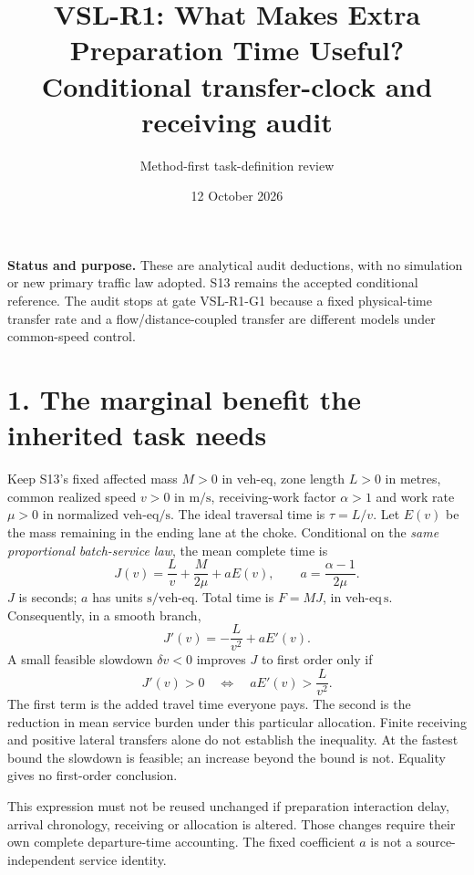 \documentclass[11pt]{article}
\title{VSL-R1: What Makes Extra Preparation Time Useful?\\[0.25em]
\large Conditional transfer-clock and receiving audit}
\author{Method-first task-definition review}
\date{12 October 2026}
\newcommand{\ve}{\mathrm{veh\mbox{-}eq}}
\begin{document}
\maketitle
\vspace{-1em}

\textbf{Status and purpose.} These are analytical audit deductions, with no
simulation or new primary traffic law adopted. S13 remains the accepted
conditional reference. The audit stops at gate VSL-R1-G1 because a fixed
physical-time transfer rate and a flow/distance-coupled transfer are different
models under common-speed control.

\section*{1. The marginal benefit the inherited task needs}
Keep S13's fixed affected mass $M>0$ in $\ve$, zone length $L>0$ in metres,
common realized speed $v>0$ in $\mathrm{m/s}$, receiving-work factor
$\alpha>1$ and work rate $\mu>0$ in normalized $\ve/\mathrm{s}$.
The ideal traversal time is $\tau=L/v$. Let $E(v)$ be the mass remaining in
the ending lane at the choke. Conditional on the \emph{same proportional
batch-service law}, the mean complete time is
\begin{equation}
 J(v)=\frac{L}{v}+\frac{M}{2\mu}+aE(v),
 \qquad a=\frac{\alpha-1}{2\mu}.
 \label{eq:objective}
\end{equation}
$J$ is seconds; $a$ has units $\mathrm{s}/\ve$. Total time is $F=MJ$,
in $\ve\,\mathrm{s}$. Consequently, in a smooth branch,
\begin{equation}
 J'(v)=-\frac{L}{v^2}+aE'(v).
 \label{eq:marginal}
\end{equation}
A small feasible slowdown $\delta v<0$ improves $J$ to first order only if
\begin{equation}
 J'(v)>0\quad\Longleftrightarrow\quad
 aE'(v)>\frac{L}{v^2}.
 \label{eq:criterion}
\end{equation}
The first term is the added travel time everyone pays. The second is the
reduction in mean service burden under this particular allocation. Finite
receiving and positive lateral transfers alone do not establish the inequality.
At the fastest bound the slowdown is feasible; an increase beyond the bound
is not. Equality gives no first-order conclusion.

This expression must not be reused unchanged if preparation interaction delay,
arrival chronology, receiving or allocation is altered. Those changes require
their own complete departure-time accounting. The fixed coefficient $a$ is
not a source-independent service identity.
\end{document}
